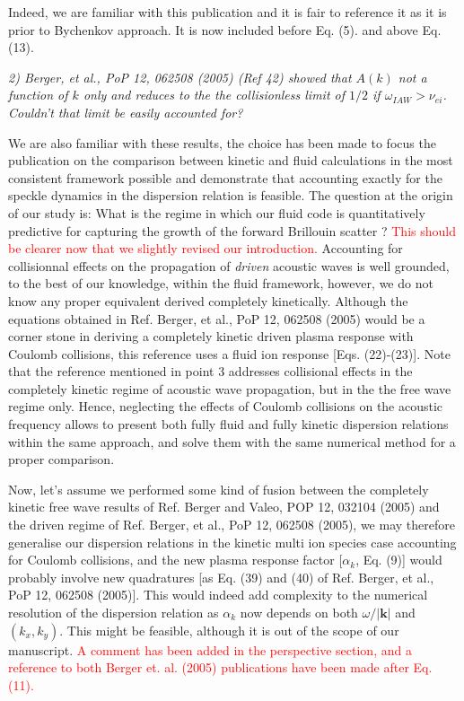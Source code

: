\documentclass{article}
\def\tc{\textcolor{red}}
\begin{document}
Indeed, we are familiar with this publication and it is fair to reference it as it is prior to Bychenkov approach. It is now included before Eq. (5). and above Eq. (13).

\textit{
2)   Berger, et al., PoP 12, 062508 (2005) (Ref 42) showed that $A(k)$ not a function of $k$
only and reduces to the the collisionless limit of $1/2$ if $\omega_{IAW} > \nu_{ei}$. Couldn’t that limit
be easily accounted for?
}

We are also familiar with these results, the choice has been made to focus the publication on the comparison between kinetic and fluid calculations in the most consistent framework possible and demonstrate that accounting exactly for the speckle dynamics in the dispersion relation is feasible. The question at the origin of our study is: What is the  regime  in which our fluid code is quantitatively predictive for capturing the growth of the forward Brillouin scatter ? \tc{This should be clearer now that we slightly revised our introduction.} 
Accounting for collisionnal effects on the propagation of \emph{driven} acoustic waves is well grounded, to the best of our knowledge, within  the fluid framework, however, we do not know any proper equivalent derived completely kinetically. Although the equations obtained in  Ref. Berger, et al., PoP 12, 062508 (2005) would be a corner stone in deriving a completely kinetic driven plasma response with Coulomb collisions,  this reference uses a fluid ion response [Eqs. (22)-(23)].
Note that the reference  mentioned in point 3 addresses  collisional effects in the completely kinetic regime of acoustic wave propagation, but in the the free wave regime only.
Hence, neglecting the effects of Coulomb collisions on the acoustic frequency allows to present both fully fluid and fully kinetic dispersion relations within the same approach, and solve them with the same numerical method for a proper comparison.

Now, let's  assume we performed some kind of fusion between the completely kinetic free wave results of Ref. Berger and Valeo, POP 12, 032104 (2005) and the driven regime of  Ref. Berger, et al., PoP 12, 062508 (2005), we may therefore generalise our dispersion relations in the kinetic multi ion species case accounting for Coulomb collisions, and the new plasma response factor [$\alpha_k$, Eq. (9)]  would probably involve new quadratures [as Eq. (39) and  (40) of Ref. Berger, et al., PoP 12, 062508 (2005)]. This would indeed add complexity to the numerical resolution of the dispersion relation as $\alpha_k$ now depends on both $\omega/\vert \mathbf{k} \vert $ and $(k_x, k_y)$. This might be feasible,  although it is out of the scope of our manuscript. \tc{A comment has been added in the perspective section, and a reference to both Berger et. al. (2005) publications have been made after Eq. (11).}
\end{document}
